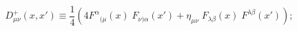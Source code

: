 \begin{equation} 
\label{hs2} 
D_{\mu \nu}^{+}(x,x')\equiv 
\frac{1}{4} 
\left( 
4F^\alpha{}_{(\mu}(x) \;F_{\nu )\alpha}(x')+ 
\eta _{\mu \nu}\; F_{\lambda \beta}(x)\; F^{\lambda \beta}(x')\right); 
\end{equation} 

